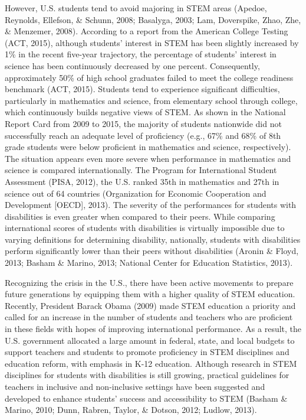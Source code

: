 \documentclass[11.5pt]{sig-alternate} %
\begin{document}
\begin{large}
However, U.S. students tend to avoid majoring in STEM areas (Apedoe, Reynolds, Ellefson, \& Schunn, 2008; Basalyga, 2003; Lam, Doverspike, Zhao, Zhe, \& Menzemer, 2008).  According to a report from the American College Testing (ACT, 2015), although students’ interest in STEM has been slightly increased by 1\% in the recent five-year trajectory, the percentage of students’ interest in science has been continuously decreased by one percent.  Consequently, approximately 50\% of high school graduates failed to meet the college readiness benchmark (ACT, 2015).  Students tend to experience significant difficulties, particularly in mathematics and science, from elementary school through college, which continuously builds negative views of STEM. As shown in the National Report Card from 2009 to 2015, the majority of students nationwide did not successfully reach an adequate level of proficiency (e.g., 67\% and 68\% of 8th grade students were below proficient in mathematics and science, respectively).  The situation appears even more severe when performance in mathematics and science is compared internationally.  The Program for International Student Assessment (PISA, 2012), the U.S. ranked 35th in mathematics and 27th in science out of 64 countries (Organization for Economic Cooperation and Development [OECD], 2013).  The severity of the performances for students with disabilities is even greater when compared to their peers.  While comparing international scores of students with disabilities is virtually impossible due to varying definitions for determining disability, nationally, students with disabilities perform significantly lower than their peers without disabilities (Aronin \& Floyd, 2013; Basham \& Marino, 2013; National Center for Education Statistics, 2013). 

Recognizing the crisis in the U.S., there have been active movements to prepare future generations by equipping them with a higher quality of STEM education.  Recently, President Barack Obama (2009) made STEM education a priority and called for an increase in the number of students and teachers who are proficient in these fields with hopes of improving international performance.  As a result, the U.S. government allocated a large amount in federal, state, and local budgets to support teachers and students to promote proficiency in STEM disciplines and education reform, with emphasis in K-12 education.  Although research in STEM disciplines for students with disabilities is still growing, practical guidelines for teachers in inclusive and non-inclusive settings have been suggested and developed to enhance students’ success and accessibility to STEM (Basham \& Marino, 2010; Dunn, Rabren, Taylor, \& Dotson, 2012; Ludlow, 2013).


\end{large}
\end{document}
